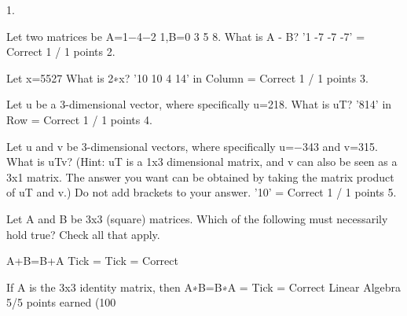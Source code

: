 1.

Let two matrices be A=1−4−2 1,B=0 3 5 8. What is A - B? '1 -7 -7 -7' = Correct 1 / 1 points
2. 

Let x=5527 What is 2∗x? '10 10 4 14' in Column = Correct 1 / 1 points
3. 

Let u be a 3-dimensional vector, where specifically u=218. What is uT? '814' in Row = Correct 1 / 1 points
4. 

Let u and v be 3-dimensional vectors, where specifically u=−343 and v=315.
What is uTv? (Hint: uT is a 1x3 dimensional matrix, and v can also be seen as a 3x1 matrix. The answer you want can be obtained by taking the matrix product of uT and v.) Do not add brackets to your answer. '10' = Correct 1 / 1 points
5. 

Let A and B be 3x3 (square) matrices. Which of the following must necessarily hold true? Check all that apply.

A+B=B+A Tick = Tick = Correct 

If A is the 3x3 identity matrix, then A∗B=B∗A = Tick = Correct  
Linear Algebra
5/5 points earned (100%
